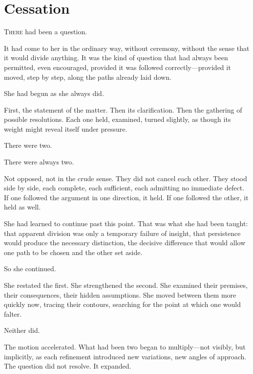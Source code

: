 
\chapter{Cessation}


\lettrine{T}{here} had been a question.

It had come to her in the ordinary way, without ceremony, without
the sense that it would divide anything. It was the kind of
question that had always been permitted, even encouraged,
provided it was followed correctly---provided it moved, step by
step, along the paths already laid down.

She had begun as she always did.

First, the statement of the matter. Then its clarification. Then
the gathering of possible resolutions. Each one held, examined,
turned slightly, as though its weight might reveal itself under
pressure.

There were two.

There were always two.

Not opposed, not in the crude sense. They did not cancel each
other. They stood side by side, each complete, each sufficient,
each admitting no immediate defect. If one followed the argument
in one direction, it held. If one followed the other, it held as
well.

She had learned to continue past this point. That was what she
had been taught: that apparent division was only a temporary
failure of insight, that persistence would produce the necessary
distinction, the decisive difference that would allow one path to
be chosen and the other set aside.

So she continued.

She restated the first. She strengthened the second. She examined
their premises, their consequences, their hidden assumptions. She
moved between them more quickly now, tracing their contours,
searching for the point at which one would falter.

Neither did.

The motion accelerated. What had been two began to
multiply---not visibly, but implicitly, as each refinement
introduced new variations, new angles of approach. The question
did not resolve. It expanded.

